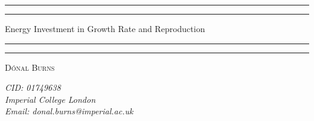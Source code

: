 \begin{titlepage} %
	
	\centering %
	
	\scshape %
	
	
	
	\rule{\textwidth}{1.6pt}\vspace*{-\baselineskip}\vspace*{2pt} %
	\rule{\textwidth}{0.4pt} %
	
	\vspace{0.75\baselineskip} %
	
	{\LARGE Energy Investment in Growth Rate and Reproduction\\} %
	
	\vspace{0.75\baselineskip} %
	
	\rule{\textwidth}{0.4pt}\vspace*{-\baselineskip}\vspace{3.2pt} %
	\rule{\textwidth}{1.6pt} %
	
	\vspace{1\baselineskip} %
	
	
	
	
	\vspace{0.5\baselineskip} %
	
	{\scshape\Large D\'onal Burns  \\} %
	
	\vspace{0.5\baselineskip} %
	
	\textit{CID: 01749638 \\ Imperial College London \\ Email: donal.burns@imperial.ac.uk} %
	

\end{titlepage}
